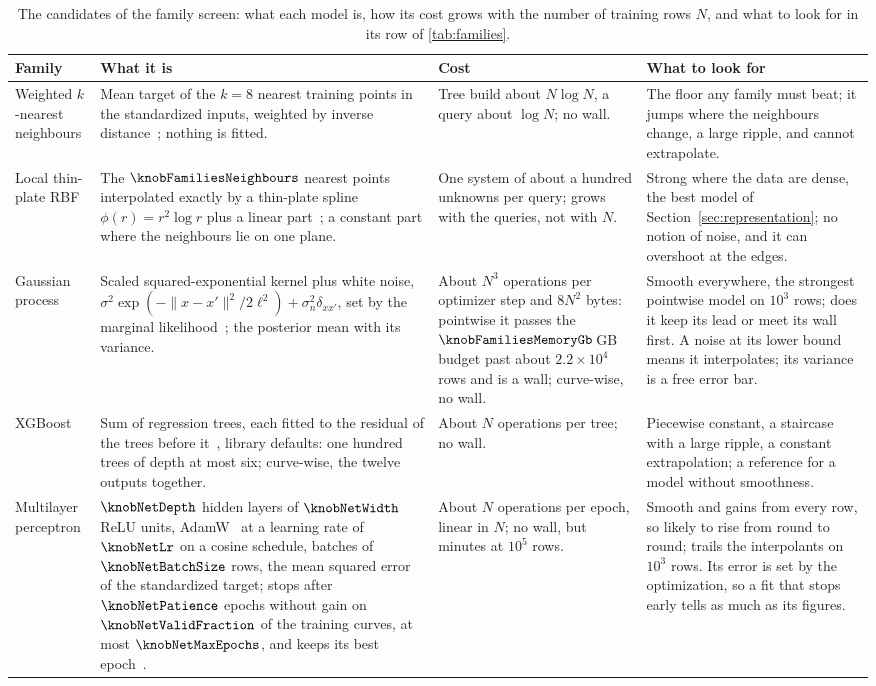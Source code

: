 \begin{table}[!htb]
\centering
\small
\caption{The candidates of the family screen: what each model is, how its cost grows with the number of training rows $N$, and what to look for in its row of \cref{tab:families}.}
\label{tab:families-models}
\begin{tabular}{@{}p{}p{}p{}p{}@{}}
\toprule
Family & What it is & Cost & What to look for \\
\midrule
Weighted $k$-nearest neighbours & Mean target of the $k = 8$ nearest training points in the standardized inputs, weighted by inverse distance~\citep{ScikitLearn2011}; nothing is fitted. & Tree build about $N \log N$, a query about $\log N$; no wall. & The floor any family must beat; it jumps where the neighbours change, a large ripple, and cannot extrapolate. \\
Local thin-plate RBF & The $\knobFamiliesNeighbours$ nearest points interpolated exactly by a thin-plate spline $\phi(r) = r^2 \log r$ plus a linear part~\citep{SciPy2020}; a constant part where the neighbours lie on one plane. & One system of about a hundred unknowns per query; grows with the queries, not with $N$. & Strong where the data are dense, the best model of Section~\ref{sec:representation}; no notion of noise, and it can overshoot at the edges. \\
Gaussian process & Scaled squared-exponential kernel plus white noise, $\sigma^2 \exp(-\lVert x - x' \rVert^2 / 2\ell^2) + \sigma_n^2 \delta_{xx'}$, set by the marginal likelihood~\citep{Rasmussen2005_GP,ScikitLearn2011}; the posterior mean with its variance. & About $N^3$ operations per optimizer step and $8 N^2$ bytes: pointwise it passes the $\knobFamiliesMemoryGb$\,GB budget past about $2.2 \times 10^4$ rows and is a wall; curve-wise, no wall. & Smooth everywhere, the strongest pointwise model on $10^3$ rows; does it keep its lead or meet its wall first. A noise at its lower bound means it interpolates; its variance is a free error bar. \\
XGBoost & Sum of regression trees, each fitted to the residual of the trees before it~\citep{TODO_XGBoost}, library defaults: one hundred trees of depth at most six; curve-wise, the twelve outputs together. & About $N$ operations per tree; no wall. & Piecewise constant, a staircase with a large ripple, a constant extrapolation; a reference for a model without smoothness. \\
Multilayer perceptron & $\knobNetDepth$ hidden layers of $\knobNetWidth$ ReLU units, AdamW~\citep{Loshchilov2017_AdamW} at a learning rate of $\knobNetLr$ on a cosine schedule, batches of $\knobNetBatchSize$ rows, the mean squared error of the standardized target; stops after $\knobNetPatience$ epochs without gain on $\knobNetValidFraction$ of the training curves, at most $\knobNetMaxEpochs$, and keeps its best epoch~\citep{PyTorch2019}. & About $N$ operations per epoch, linear in $N$; no wall, but minutes at $10^5$ rows. & Smooth and gains from every row, so likely to rise from round to round; trails the interpolants on $10^3$ rows. Its error is set by the optimization, so a fit that stops early tells as much as its figures. \\

\end{tabular}
\end{table}
